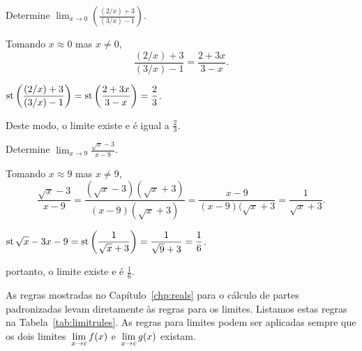 \begin{example}
  Determine $\displaystyle \lim_{x \to 0}
    \left(\frac{(2/x)+3}{(3/x)-1}\right)$.
  \begin{stepanalysis}
  \item Tomando $x \approx 0$ mas $x \ne 0$,
        $$
          \frac{(2/x) + 3}{(3/x) - 1} = \frac{2 + 3x}{3 - x}.
        $$
  \item $\displaystyle \operatorname{st}\left(\frac{(2/x)+3}{(3/x)-1}\right) =
          \operatorname{st}\left(\frac{2 + 3x}{3 - x}\right) = \frac{2}{3}$.

        Deste modo, o limite existe e é igual a $\frac{2}{3}$.
  \end{stepanalysis}
\end{example}

\begin{example}
  Determine $\displaystyle \lim_{x \to 9} \frac{\sqrt{x} - 3}{x-9}$.
  \begin{stepanalysis}
  \item Tomando $x \approx 9$ mas $x \ne 9$,
        $$
          \frac{\sqrt{x}-3}{x-9} =
            \frac{(\sqrt{x}-3)(\sqrt{x}+3)}{(x-9)(\sqrt{x}+3)} =
            \frac{x - 9}{(x-9)(\sqrt{x}+3} = \frac{1}{\sqrt{x} + 3}.
        $$
  \item $\displaystyle \operatorname{st}{\sqrt{x}-3}{x - 9} = \operatorname{st}\left(\frac{1}{\sqrt{x}+3}\right) = \frac{1}{\sqrt{9}+3} = \frac{1}{6}$.

        portanto, o limite existe e é $\frac{1}{6}$.
  \end{stepanalysis}
\end{example}

As regras mostradas no Capítulo~\ref{chp:reals} para o cálculo de partes
padronizadas levam diretamente às regras para os limites. Listamos estas
regras na Tabela~\ref{tab:limitrules}. As regras para limites podem ser
aplicadas sempre que os dois limites $\dslim{x \to c} f(x)$ e
$\dslim{x \to c} g(x)$ existam.

